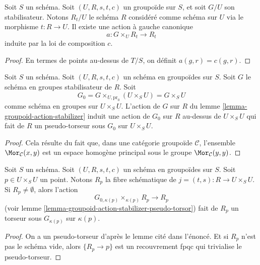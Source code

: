 \begin{lemma}
\label{lemma-groupoid-action-stabilizer}
Soit $S$ un schéma.
Soit $(U, R, s, t, c)$ un groupoïde sur $S$, et soit $G/U$ son stabilisateur.
Notons $R_t/U$ le schéma $R$ considéré comme schéma sur $U$ via le
morphisme $t : R \to U$.
Il existe une action à gauche canonique
$$
a : G \times_U R_t \longrightarrow R_t
$$
induite par la loi de composition $c$.
\end{lemma}

\begin{proof}
En termes de points au-dessus de $T/S$, on définit $a(g, r) = c(g, r)$.
\end{proof}

\begin{lemma}
\label{lemma-groupoid-action-stabilizer-pseudo-torsor}
Soit $S$ un schéma. Soit $(U, R, s, t, c)$ un schéma en groupoïdes
sur $S$. Soit $G$ le schéma en groupes stabilisateur de $R$.
Soit
$$
G_0 = G \times_{U, \text{pr}_0} (U \times_S U) = G \times_S U
$$
comme schéma en groupes sur $U \times_S U$. L'action de $G$ sur $R$ du
lemme \ref{lemma-groupoid-action-stabilizer}
induit une action de $G_0$ sur $R$ au-dessus de $U \times_S U$
qui fait de $R$ un pseudo-torseur sous $G_0$ sur $U \times_S U$.
\end{lemma}

\begin{proof}
Cela résulte du fait que, dans une catégorie groupoïde $\mathcal{C}$, l'ensemble
$\Mor_\mathcal{C}(x, y)$ est un espace homogène principal
sous le groupe $\Mor_\mathcal{C}(y, y)$.
\end{proof}

\begin{lemma}
\label{lemma-fibres-j}
Soit $S$ un schéma. Soit $(U, R, s, t, c)$ un schéma en groupoïdes sur $S$.
Soit $p \in U \times_S U$ un point. Notons
$R_p$ la fibre schématique de $j = (t, s) : R \to U \times_S U$.
Si $R_p \not = \emptyset$, alors l'action
$$
G_{0, \kappa(p)} \times_{\kappa(p)} R_p \longrightarrow R_p
$$
(voir
lemme \ref{lemma-groupoid-action-stabilizer-pseudo-torsor})
fait de $R_p$ un torseur sous $G_{\kappa(p)}$ sur $\kappa(p)$.
\end{lemma}

\begin{proof}
On a un pseudo-torseur d'après le lemme cité dans l'énoncé.
Et si $R_p$ n'est pas le schéma vide, alors $\{R_p \to p\}$
est un recouvrement fpqc qui trivialise le pseudo-torseur.
\end{proof}







